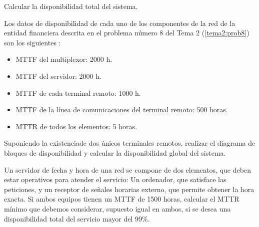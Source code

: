 Calcular la disponibilidad total del sistema.

\TheSolution



\Problem[4]
Los datos de disponibilidad de cada uno de los componentes de la red de la entidad financiera descrita en el problema número 8 del Tema 2 (\ref{tema2:prob8}) son los siguientes :
\begin{itemize}
	\item MTTF del multiplexor: 2000 h.
	\item MTTF del servidor: 2000 h.
	\item MTTF de cada terminal remoto: 1000 h.
	\item MTTF de la línea de comunicaciones del terminal remoto: 500 horas.
	\item MTTR de todos los elementos: 5 horas.
\end{itemize}

Suponiendo la existenciade dos únicos terminales remotos, realizar el
diagrama de bloques de disponibilidad y calcular la disponibilidad global del
sistema.

\TheSolution



\Problem[5]
Un servidor de fecha y hora de una red se compone de dos elementos, que deben estar operativos para
atender el servicio: Un ordenador, que satisface las peticiones, y un receptor
de señales horarias externo, que permite obtener la hora exacta. Si ambos equipos
tienen un MTTF de 1500 horas, calcular el MTTR mínimo que debemos considerar,
supuesto igual en ambos, si se desea una disponibilidad total del servicio mayor del 99\%.

\TheSolution



